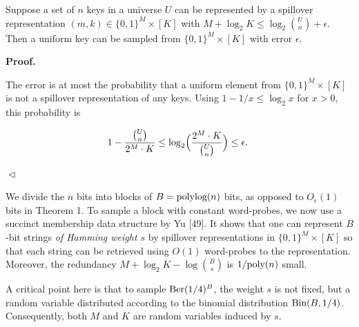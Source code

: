 \documentclass[10pt,a4paper]{article}
\begin{document}
Suppose a set of $n$ keys in a universe $U$ can be represented by a spillover representation $(m,k)\in\{0,1\}^{M}\times[K]$ with
$M+\log_{2}K\leq\log_{2}\binom{U}{n}+\epsilon$.
Then a uniform key can be sampled from $\{0,1\}^{M}\times[K]$ with error $\epsilon$.\par






\par\medskip\noindent\textbf{
\textbf{Proof}.}\par




The error is at most the probability that a uniform element from $\{0,1\}^{M}\times[K]$ is not a spillover representation of any keys.
Using $1-1/x\leq\log_{2}x$ for $x>0$, this probability is\par


\[\begin{gathered}
1-\frac{\binom{U}{n}}{2^{M}\cdot K}\leq\log_{2}\Bigl(\frac{2^{M}\cdot K}{\binom{U}{n}}\Bigr)\leq\epsilon.\
\end{gathered}\]


$\vartriangleleft$\par




We divide the $n$ bits into blocks of $B=\textnormal{polylog}(n)$ bits, as opposed to $O_{\epsilon}(1)$ bits in Theorem 1.
To sample a block with constant word-probes, we now use a succinct membership data structure by Yu [49].
It shows that one can represent $B$-bit strings \emph{of Hamming weight $s$} by spillover representations in $\{0,1\}^{M}\times[K]$ so that each string can be retrieved using $O(1)$ word-probes to the representation. Moreover, the redundancy $M+\log_{2}K-\log\binom{B}{s}$ is $1/\textnormal{poly}(n)$ small.\par




A critical point here is that to sample $\textnormal{Ber}(1/4)^{B}$, the weight $s$ is not fixed, but a random variable distributed according to the binomial distribution $\textnormal{Bin}(B,1/4)$. Consequently, both $M$ and $K$ are random variables induced by $s$.\par
\end{document}
